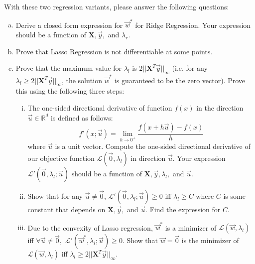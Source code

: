 \documentclass[11pt]{article}
\begin{document}
\noindent With these two regression variants, please answer the following questions:
\begin{enumerate}[(a)]
    \item Derive a closed form expression for $\vec{w}^*$ for Ridge Regression. Your expression should be a function of $\textbf{X}, \vec{y},$ and $\lambda_r$.

    \item Prove that Lasso Regression is not differentiable at some points.

    \item Prove that the maximum value for $\lambda_l$ is $2||\textbf{X}^T\vec{y}||_\infty$ (i.e. for any $\lambda_l\ge 2||\textbf{X}^T\vec{y}||_\infty$, the solution $\vec{w}^*$ is guaranteed to be the zero vector). Prove this using the following three steps:
    \begin{enumerate}[(i)]
        \item The one-sided directional derivative of function $f(x)$ in the direction $\vec{u}\in \mathbb{R}^d$ is defined as follows:
$$f'(x;\vec{u}) = \lim\limits_{h\rightarrow 0^+} \frac{f(x+h\vec{u})-f(x)}{h}$$
where $\vec{u}$ is a unit vector. Compute the one-sided directional derivative of our objective function $\mathcal{L}(\vec{0},\lambda_l)$ in direction $\vec{u}$. Your expression $\mathcal{L}'(\vec{0},\lambda_l;\vec{u})$ should be a function of $\textbf{X}, \vec{y}, \lambda_l,$ and $\vec{u}$.

        \item Show that for any $\vec{u}\neq\vec{0}$, $\mathcal{L}'(\vec{0},\lambda_l;\vec{u})\ge 0$ iff $\lambda_l\ge C$ where $C$ is some constant that depends on $\textbf{X}, \vec{y},$ and $\vec{u}$. Find the expression for $C$.

        \item Due to the convexity of Lasso regression, $\vec{w}^*$ is a minimizer of $\mathcal{L}(\vec{w},\lambda_l)$ iff $\forall \vec{u}\neq\vec{0},$ $\mathcal{L}'(\vec{w}^*,\lambda_l;\vec{u})\ge 0$. Show that $\vec{w}=\vec{0}$ is the minimizer of $\mathcal{L}(\vec{w},\lambda_l)$ iff $\lambda_l\ge 2||\textbf{X}^T\vec{y}||_\infty$.
    \end{enumerate}
\end{enumerate}\newpage
\end{document}
